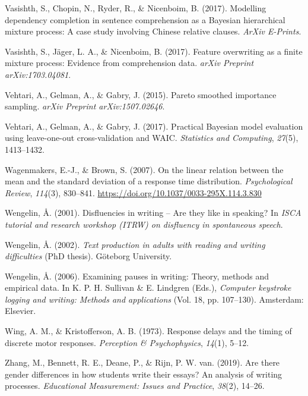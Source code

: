 \documentclass[
  english,
  man,mask,floatsintext]{apa7}
\newlength{\cslhangindent}
\newenvironment{cslreferences}%
  {\setlength{\parindent}{0pt}%
  \everypar{\setlength{\hangindent}{\cslhangindent}}\ignorespaces}%
  {\par}
\begin{document}
\begin{cslreferences}
\leavevmode\hypertarget{ref-vasishth2017}{}%
Vasishth, S., Chopin, N., Ryder, R., \& Nicenboim, B. (2017). Modelling dependency completion in sentence comprehension as a Bayesian hierarchical mixture process: A case study involving Chinese relative clauses. \emph{ArXiv E-Prints}.

\leavevmode\hypertarget{ref-vasishth2017feature}{}%
Vasishth, S., Jäger, L. A., \& Nicenboim, B. (2017). Feature overwriting as a finite mixture process: Evidence from comprehension data. \emph{arXiv Preprint arXiv:1703.04081}.

\leavevmode\hypertarget{ref-vehtari2015pareto}{}%
Vehtari, A., Gelman, A., \& Gabry, J. (2015). Pareto smoothed importance sampling. \emph{arXiv Preprint arXiv:1507.02646}.

\leavevmode\hypertarget{ref-vehtari2017practical}{}%
Vehtari, A., Gelman, A., \& Gabry, J. (2017). Practical Bayesian model evaluation using leave-one-out cross-validation and WAIC. \emph{Statistics and Computing}, \emph{27}(5), 1413--1432.

\leavevmode\hypertarget{ref-wagenmakers2007linear}{}%
Wagenmakers, E.-J., \& Brown, S. (2007). On the linear relation between the mean and the standard deviation of a response time distribution. \emph{Psychological Review}, \emph{114}(3), 830--841. \url{https://doi.org/10.1037/0033-295X.114.3.830}

\leavevmode\hypertarget{ref-wengelin2001disfluencies}{}%
Wengelin, Å. (2001). Disfluencies in writing -- Are they like in speaking? In \emph{ISCA tutorial and research workshop (ITRW) on disfluency in spontaneous speech}.

\leavevmode\hypertarget{ref-wen02}{}%
Wengelin, Å. (2002). \emph{Text production in adults with reading and writing difficulties} (PhD thesis). Göteborg University.

\leavevmode\hypertarget{ref-wen06}{}%
Wengelin, Å. (2006). Examining pauses in writing: Theory, methods and empirical data. In K. P. H. Sullivan \& E. Lindgren (Eds.), \emph{Computer keystroke logging and writing: Methods and applications} (Vol. 18, pp. 107--130). Amsterdam: Elsevier.

\leavevmode\hypertarget{ref-wing1973response}{}%
Wing, A. M., \& Kristofferson, A. B. (1973). Response delays and the timing of discrete motor responses. \emph{Perception \& Psychophysics}, \emph{14}(1), 5--12.

\leavevmode\hypertarget{ref-zhang2019there}{}%
Zhang, M., Bennett, R. E., Deane, P., \& Rijn, P. W. van. (2019). Are there gender differences in how students write their essays? An analysis of writing processes. \emph{Educational Measurement: Issues and Practice}, \emph{38}(2), 14--26.
\end{cslreferences}
\end{document}
